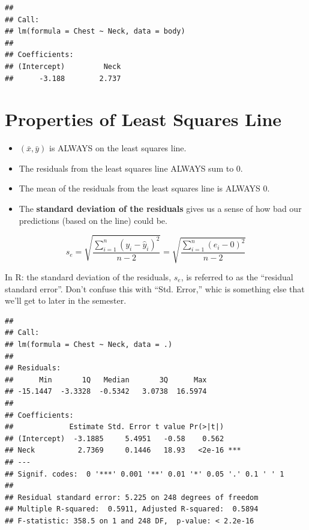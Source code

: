 \documentclass[]{book}
\newenvironment{Shaded}{\begin{snugshade}}{\end{snugshade}}
\newcommand{\CommentTok}[1]{\textcolor[rgb]{0.56,0.35,0.01}{\textit{#1}}}
\newcommand{\DataTypeTok}[1]{\textcolor[rgb]{0.13,0.29,0.53}{#1}}
\newcommand{\KeywordTok}[1]{\textcolor[rgb]{0.13,0.29,0.53}{\textbf{#1}}}
\newcommand{\NormalTok}[1]{#1}
\newcommand{\OperatorTok}[1]{\textcolor[rgb]{0.81,0.36,0.00}{\textbf{#1}}}
\newcommand{\StringTok}[1]{\textcolor[rgb]{0.31,0.60,0.02}{#1}}
\begin{document}
\begin{verbatim}
## 
## Call:
## lm(formula = Chest ~ Neck, data = body)
## 
## Coefficients:
## (Intercept)         Neck  
##      -3.188        2.737
\end{verbatim}

\hypertarget{properties-of-least-squares-line}{%
\section{Properties of Least Squares Line}\label{properties-of-least-squares-line}}

\begin{itemize}
\item
  \((\bar{x},\bar{y})\) is ALWAYS on the least squares line.
\item
  The residuals from the least squares line ALWAYS sum to 0.
\item
  The mean of the residuals from the least squares line is ALWAYS 0.
\item
  The \textbf{standard deviation of the residuals} gives us a sense of how bad our predictions (based on the line) could be.
\end{itemize}

\[s_e = \sqrt{\frac{\sum^n_{i=1} (y_i-\hat{y}_i)^2}{n-2}}  = \sqrt{\frac{\sum^n_{i=1} (e_i-0)^2}{n-2}} \]

In R: the standard deviation of the residuals, \(s_e\), is referred to as the ``residual standard error''. Don't confuse this with ``Std. Error,'' whic is something else that we'll get to later in the semester.

\begin{Shaded}
\end{Shaded}

\begin{verbatim}
## 
## Call:
## lm(formula = Chest ~ Neck, data = .)
## 
## Residuals:
##      Min       1Q   Median       3Q      Max 
## -15.1447  -3.3328  -0.5342   3.0738  16.5974 
## 
## Coefficients:
##             Estimate Std. Error t value Pr(>|t|)    
## (Intercept)  -3.1885     5.4951   -0.58    0.562    
## Neck          2.7369     0.1446   18.93   <2e-16 ***
## ---
## Signif. codes:  0 '***' 0.001 '**' 0.01 '*' 0.05 '.' 0.1 ' ' 1
## 
## Residual standard error: 5.225 on 248 degrees of freedom
## Multiple R-squared:  0.5911, Adjusted R-squared:  0.5894 
## F-statistic: 358.5 on 1 and 248 DF,  p-value: < 2.2e-16
\end{verbatim}
\end{document}
